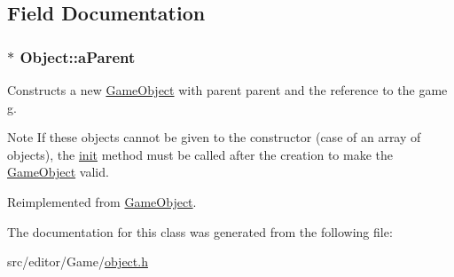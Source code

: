 \subsection{\-Field \-Documentation}
\hypertarget{class_object_a4b9173b5a9a1e5c313df5b574716037a}{
\subsubsection[{a\-Parent}]{$\ast$ {\bf \-Object\-::a\-Parent}}}\label{class_object_a4b9173b5a9a1e5c313df5b574716037a}
\-Constructs a new \hyperlink{class_game_object}{\-Game\-Object} with parent {\ttfamily parent} and the reference to the game {\ttfamily g}.

\begin{DoxyNote}{\-Note}
\-If these objects cannot be given to the constructor (case of an array of objects), the \hyperlink{class_game_object_a97be7b59b2e76e7d60de2146b894eed9}{init} method must be called after the creation to make the \hyperlink{class_game_object}{\-Game\-Object} valid. 
\end{DoxyNote}


\-Reimplemented from \hyperlink{class_game_object_a41d4afe43f955e78ede0bbd4ad8957f8}{\-Game\-Object}.



\-The documentation for this class was generated from the following file\-:\begin{DoxyCompactItemize}
\item 
src/editor/\-Game/\hyperlink{object_8h}{object.\-h}\end{DoxyCompactItemize}
